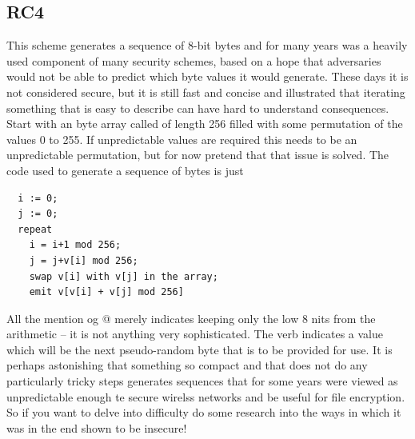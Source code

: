 \subsection{RC4}
This scheme generates a sequence of 8-bit bytes and for many years was
a heavily used component of many security schemes, based on a hope that
adversaries would not be able to predict which byte values it would generate.
These days it is not considered secure, but it is still fast and concise
and illustrated that iterating something that is easy to describe can have
hard to understand consequences.
Start with an byte array called \verb@v@ of length 256 filled with some
permutation of the values 0 to 255. If unpredictable values are required
this needs to be an unpredictable permutation, but for now pretend that
that issue is solved.
The code used to generate a sequence of bytes is just
\begin{verbatim}
  i := 0;
  j := 0;
  repeat
    i = i+1 mod 256;
    j = j+v[i] mod 256;
    swap v[i] with v[j] in the array;
    emit v[v[i] + v[j] mod 256]
\end{verbatim}
All the mention og @ merely indicates keeping only the low
8 nits from the arithmetic -- it is not anything very sophisticated. The
verb \verb@emit@ indicates a value which will be the next pseudo-random byte
that is to be provided for use. It is perhaps astonishing that something
so compact and that does not do any particularly tricky steps generates
sequences that for some years were viewed as unpredictable enough te
secure wirelss networks and be useful for file encryption. So if you want to
delve into difficulty do some research into the ways in which it was in the
end shown to be insecure!
